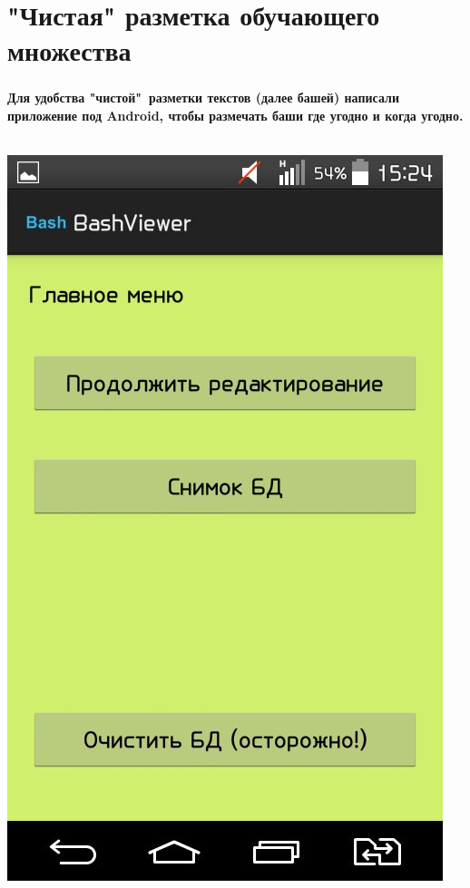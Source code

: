 \documentclass[t]{beamer}
\begin{document}
	\section{"Чистая" разметка обучающего множества}
	\begin{frame}
		\frametitle{\insertsection}
		\textbf{ Для удобства "чистой"\ разметки текстов (далее башей) написали приложение под Android, чтобы размечать баши где угодно и когда угодно.}
		
		~~~~~~~
		{\includegraphics[scale = 0.17]{images/Bash1.jpg}
}
\end{frame}
\end{document}
